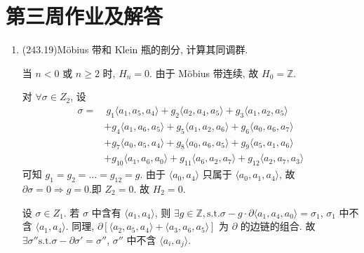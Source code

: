 \section{第三周作业及解答}
\begin{enumerate}
\item(243.19) Möbius 带和 Klein 瓶的剖分, 计算其同调群.
\begin{proofc}[解答]


\begin{center}
\end{center}

当 $n<0$ 或 $n \geqslant 2$ 时, $H_n = 0$.
由于 Möbius 带连续, 故 $H_0 = \mathbb{Z}$.

对 $\forall \sigma \in Z_2$, 设
\[
\begin{aligned}
\sigma = & \ g_1 \langle a_1, a_5, a_4 \rangle + g_2 \langle a_2, a_4, a_5 \rangle + g_3 \langle a_1, a_2, a_5 \rangle \\
         & + g_4 \langle a_1, a_6, a_5 \rangle + g_5 \langle a_1, a_2, a_6 \rangle + g_6 \langle a_0, a_6, a_7 \rangle \\
         & + g_7 \langle a_0, a_5, a_4 \rangle + g_8 \langle a_0, a_6, a_5 \rangle + g_9 \langle a_5, a_1, a_6 \rangle \\
         & + g_{10} \langle a_1, a_6, a_0 \rangle + g_{11} \langle a_6, a_2, a_7 \rangle + g_{12} \langle a_2, a_7, a_3 \rangle
\end{aligned}
\]
可知 $g_1=g_2=\dots=g_{12}=g$.
由于 $\langle a_0, a_4 \rangle$ 只属于 $\langle a_0, a_1, a_4 \rangle$, 故 $\partial\sigma=0 \Rightarrow g=0$.即 $Z_2=0$.
故 $H_2=0$.

设 $\sigma \in Z_1$.
若 $\sigma$ 中含有 $\langle a_1, a_4 \rangle$, 则 $\exists g \in \mathbb{Z}, \text{s.t.} \sigma - g \cdot \partial \langle a_1, a_4, a_0 \rangle = \sigma_1$, $\sigma_1$ 中不含 $\langle a_1, a_4 \rangle$.
同理, $\partial[\langle a_2, a_5, a_4 \rangle + \langle a_3, a_6, a_5 \rangle]$ 为 $\partial$ 的边链的组合.
故 $\exists \sigma'' \text{s.t.} \sigma - \partial \sigma' = \sigma''$, $\sigma''$ 中不含 $\langle a_i, a_j \rangle$.


\end{proofc}
\end{enumerate}

